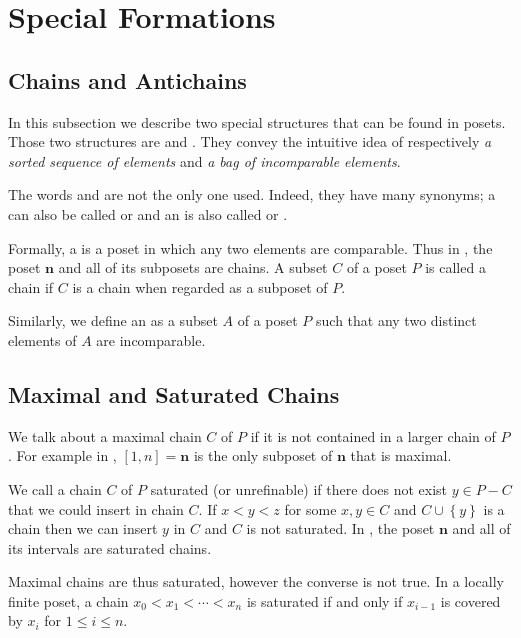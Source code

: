 \section{Special Formations}

\subsection*{Chains and Antichains}

In this subsection we describe two special structures that can be found in
posets. Those two structures are  and .
They convey the intuitive idea of respectively \emph{a sorted sequence of
elements} and \emph{a bag of incomparable elements}.

The words  and  are not the only one used.
Indeed, they have many synonyms; a  can also be called
 or  and an
 is also called  or
.


Formally, a  is a poset in which any two elements are
comparable. Thus in , the poset $\bm{n}$ and all of its
subposets are chains. A subset $C$ of a poset $P$ is called a chain if $C$ is a
chain when regarded as a subposet of $P$.

Similarly, we define an  as a subset $A$ of a poset $P$ such
that any two distinct elements of $A$ are incomparable.

\subsection*{Maximal and Saturated Chains}

We talk about a maximal chain $C$ of $P$ if it is not contained in a larger
chain of $P$. For example in , $[1, n] = \bm{n}$ is the
only subposet of $\bm{n}$ that is maximal.

We call a chain $C$ of $P$ saturated (or unrefinable) if there does not exist
$y \in P - C$ that we could insert in chain $C$. If $x < y < z$ for some $x, y
\in C$ and $C \cup \left\{{y}\right\}$ is a chain then we can insert $y$ in $C$
and $C$ is not saturated. In , the poset $\bm{n}$ and all
of its intervals are saturated chains.

Maximal chains are thus saturated, however the converse is not true. In a
locally finite poset, a chain $x_0 < x_1 < \cdots < x_n$ is saturated if and
only if $x_{i-1}$ is covered by $x_i$ for $1 \le i \le n$.


